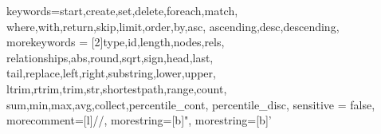 \documentclass[10pt,a4paper,twoside]{tudelft-report}
\begin{document}
% 
% 
% 
%   
% 
% 
% 
% 
% 
% 
% 

\frontmatter


 {
  keywords={start,create,set,delete,foreach,match,%
    where,with,return,skip,limit,order,by,asc,%
    ascending,desc,descending},
  morekeywords = {[2]type,id,length,nodes,rels,%
    relationships,abs,round,sqrt,sign,head,last,%
    tail,replace,left,right,substring,lower,upper,%
    ltrim,rtrim,trim,str,shortestpath,range,count,%
    sum,min,max,avg,collect,percentile\_cont,%
    percentile\_disc},
  sensitive = false,
  morecomment=[l]{//},
  morestring=[b]",
  morestring=[b]'
}
 
\lstset{style=mystyle}




\tableofcontents

\mainmatter
\end{document}
